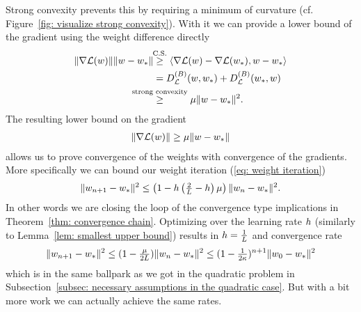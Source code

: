 Strong convexity prevents this by requiring a minimum of curvature (cf.
Figure~\ref{fig: visualize strong convexity}). With it we can provide a lower
bound of the gradient using the weight difference directly
\begin{align}
	\nonumber
	\|\nabla\Loss(\weights)\|\|\weights -\minimum\|
	&\lxge{\text{C.S.}} \langle \nabla\Loss(\weights) -\nabla\Loss(\minimum), \weights - \minimum \rangle\\
	\nonumber
	&= \bregmanDiv{\Loss}(\weights, \minimum) + \bregmanDiv{\Loss}(\minimum, \weights)\\
	\label{eq: strong convexity implies PL}
	&\lxge{\text{strong convexity}} \lbound \|\weights-\minimum\|^2.
\end{align}
The resulting lower bound on the gradient 
\begin{align*}
	\|\nabla\mathcal{L}(w)\|\ge \mu\|w -w_*\|
\end{align*}
allows us to prove convergence of the weights with convergence of the gradients.
More specifically we can bound our weight iteration (\ref{eq: weight iteration})
\begin{align*}
	\|w_{n+1}-w_*\|^2
	\le \left(1-h\left(\tfrac2{L} -h\right)\mu\right)
	\|w_n - w_*\|^2.
\end{align*}
In other words we are closing the loop of the convergence type implications in
Theorem~\ref{thm: convergence chain}. Optimizing over the learning rate \(h\)
(similarly to Lemma~\ref{lem: smallest upper bound}) results in
\(h=\tfrac1{L}\) and convergence rate
\begin{align*}
	\|w_{n+1}-w_*\|^2
	\le (1-\tfrac{\mu}{2L})\|w_n - w_*\|^2
	\le (1-\tfrac{1}{2\kappa})^{n+1}\|w_0-w_*\|^2
\end{align*}
%
which is in the same ballpark as we got in the quadratic problem in
Subsection~\ref{subsec: necessary assumptions in the quadratic case}. But with a
bit more work we can actually achieve the same rates.
%
